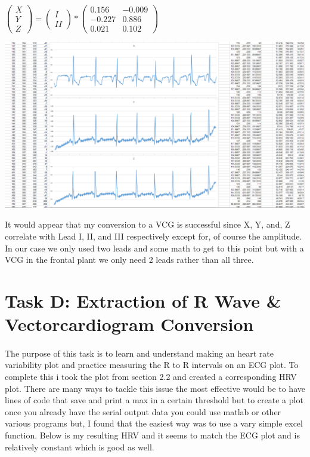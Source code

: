 \documentclass[12pt]{article}
\begin{document}
				\begin{center}
					$\begin{pmatrix}
						X \\
						Y \\
						Z
					\end{pmatrix}
					=
					\begin{pmatrix}
						I \\
						II
					\end{pmatrix}
					*
					\begin{pmatrix}
						0.156 & -0.009 \\
						-0.227 & 0.886 \\
						0.021 & 0.102
					\end{pmatrix}$
				\end{center}

				\begin{center}
					\includegraphics[scale=0.3]{vector.PNG}\\
				\end{center}

				It would appear that my conversion to a VCG is successful since X, Y, and, Z correlate with Lead I, II, and III respectively except for, of 
				course the amplitude.  In our case we only used two leads and some math to get to this point but with a VCG in the frontal plant we only
				need 2 leads rather than all three.

	\section{Task D: Extraction of R Wave \& Vectorcardiogram Conversion}
		\paragraph{}
			The purpose of this task is to learn and understand making an heart rate variability plot and practice measuring the R to R intervals on an ECG plot. To 
			complete this i took the plot from section 2.2 and created a corresponding HRV plot.  There are many ways to tackle this issue the most effective would
			be to have lines of code that save and print a max in a certain threshold but to create a plot once you already have the serial output data you could use 
			matlab or other various programs but, I found that the easiest way was to use a vary simple excel function.  Below is my resulting HRV and it seems to match
			the ECG plot and is relatively constant which is good as well.
\end{document}

